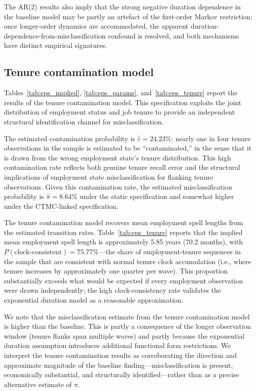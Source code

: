 The AR(2) results also imply that the strong negative duration dependence in
the baseline model may be partly an artefact of the first-order Markov
restriction: once longer-order dynamics are accommodated, the apparent
duration-dependence-from-misclassification confound is resolved, and both
mechanisms have distinct empirical signatures.

\subsection{Tenure contamination model}\label{subsec:alt:tenure}

Tables~\ref{tab:eps_implied}, \ref{tab:eps_params}, and~\ref{tab:eps_tenure}
report the results of the tenure contamination model. This specification
exploits the joint distribution of employment status and job tenure to provide
an independent structural identification channel for misclassification.

The estimated contamination probability is $\hat{\varepsilon} = 24.23\%$: nearly
one in four tenure observations in the sample is estimated to be
``contaminated,'' in the sense that it is drawn from the wrong employment state's
tenure distribution. This high contamination rate reflects both genuine tenure
recall error and the structural implications of employment state misclassification
for flanking tenure observations. Given this contamination rate, the estimated
misclassification probability is $\hat{\pi} = 8.64\%$ under the static
specification and somewhat higher under the CTMC-linked specification.

The tenure contamination model recovers mean employment spell lengths from the
estimated transition rates. Table~\ref{tab:eps_tenure} reports that the implied
mean employment spell length is approximately 5.85 years (70.2 months), with
$P(\text{clock-consistent}) = 75.77\%$---the share of employment-tenure
sequences in the sample that are consistent with normal tenure clock accumulation
(i.e., where tenure increases by approximately one quarter per wave). This
proportion substantially exceeds what would be expected if every employment
observation were drawn independently; the high clock-consistency rate validates
the exponential duration model as a reasonable approximation.

We note that the misclassification estimate from the tenure contamination model
is higher than the baseline. This is partly a consequence of the longer
observation window (tenure flanks span multiple waves) and partly because the
exponential duration assumption introduces additional functional form restrictions.
We interpret the tenure contamination results as corroborating the direction and
approximate magnitude of the baseline finding---misclassification is present,
economically substantial, and structurally identified---rather than as a precise
alternative estimate of $\pi$.

